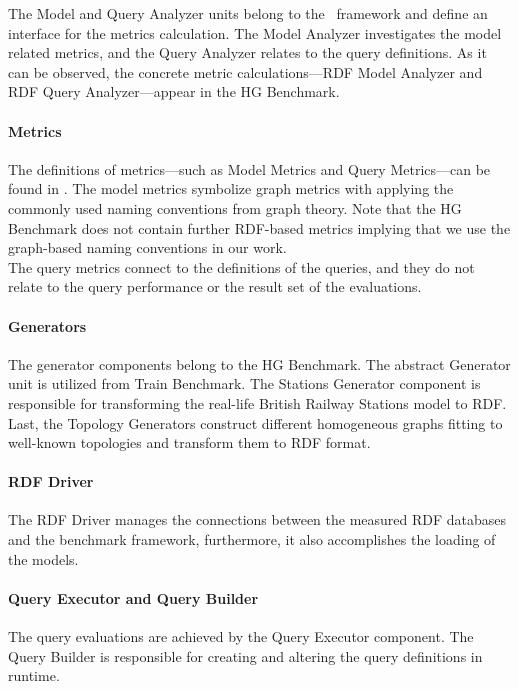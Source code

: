 The \textsf{Model} and \textsf{Query Analyzer} units belong to the \framework~framework and define an interface for the metrics calculation. The \textsf{Model Analyzer} investigates the model related metrics, and the \textsf{Query Analyzer} relates to the query definitions. As it can be observed, the concrete metric calculations---\textsf{RDF Model Analyzer} and \textsf{RDF Query Analyzer}---appear in the HG Benchmark.

\paragraph{Metrics}

The definitions of metrics---such as \textsf{Model Metrics}  and \textsf{Query Metrics}---can be found in \framework. The model metrics symbolize graph metrics with applying the commonly used naming conventions from graph theory. Note that the HG Benchmark does not contain further RDF-based metrics implying that we use the graph-based naming conventions in our work.\\
The query metrics connect to the definitions of the queries, and they do not relate to the query performance or the result set of the evaluations.

\paragraph{Generators}

The generator components belong to the HG Benchmark. The abstract \textsf{Generator} unit is utilized from Train Benchmark. The \textsf{Stations Generator} component is responsible for transforming the real-life British Railway Stations model to RDF. Last, the \textsf{Topology Generators} construct different homogeneous graphs fitting to well-known topologies and transform them to RDF format.

\paragraph{RDF Driver}
The \textsf{RDF Driver} manages the connections between the measured RDF databases and the benchmark framework, furthermore, it also accomplishes the loading of the models. 

\paragraph{Query Executor and Query Builder}

The query evaluations are achieved by the \textsf{Query Executor} component. The \textsf{Query Builder} is responsible for creating and altering the query definitions in runtime.

